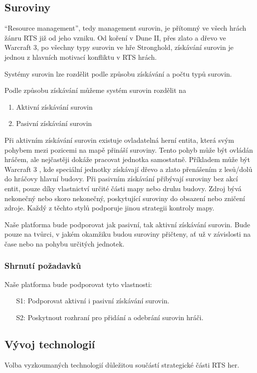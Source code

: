 \subsection{Suroviny}
\label{sec:suroviny}
``Resource management'', tedy management surovin, je přítomný ve všech hrách žánru RTS již od jeho vzniku. Od koření v Dune II, přes zlato a dřevo ve Warcraft 3, po všechny typy surovin ve hře Stronghold, získávání surovin je jednou z hlavních motivací konfliktu v RTS hrách. 

Systémy surovin lze rozdělit podle způsobu získávání a počtu typů surovin.

Podle způsobu získávání můžeme systém surovin rozdělit na
\begin{enumerate}
	\item Aktivní získávání surovin
	\item Pasivní získávání surovin
\end{enumerate}

Při aktivním získávání surovin existuje ovladatelná herní entita, která svým pohybem mezi pozicemi na mapě přináší suroviny. Tento pohyb může být ovládán hráčem, ale nejčastěji dokáže pracovat jednotka samostatně. Příkladem může být Warcraft 3 \citep{site:warcraft3}, kde speciální jednotky získávají dřevo a zlato přenášením z lesů/dolů do hráčovy hlavní budovy. Při pasivním získávání přibývají suroviny bez akcí entit, pouze díky vlastnictví určité části mapy nebo druhu budovy. Zdroj bývá nekonečný nebo skoro nekonečný, poskytující suroviny do obsazení nebo zničení zdroje. Každý z těchto stylů podporuje jinou strategii kontroly mapy.

Naše platforma bude podporovat jak pasivní, tak aktivní získávání surovin. Bude pouze na tvůrci, v jakém okamžiku budou suroviny přičteny, ať už v závislosti na čase nebo na pohybu určitých jednotek. 

\subsubsection{Shrnutí požadavků}

Naše platforma bude podporovat tyto vlastnosti:
\begin{itemize}
	\item[S1:] Podporovat aktivní i pasivní získávání surovin.
	\item[S2:] Poskytnout rozhraní pro přidání a odebrání surovin hráči.
\end{itemize}

\subsection{Vývoj technologií}
\label{sec:vyzkum}
Volba vyzkoumaných technologií důležitou součástí strategické části RTS her. 


